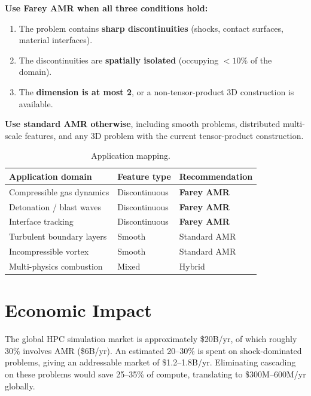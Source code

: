 \documentclass[11pt]{article}
\theoremstyle{definition}
\begin{document}
\textbf{Use Farey AMR when all three conditions hold:}
\begin{enumerate}
\item The problem contains \textbf{sharp discontinuities} (shocks,
  contact surfaces, material interfaces).
\item The discontinuities are \textbf{spatially isolated} (occupying
  $<10\%$ of the domain).
\item The \textbf{dimension is at most 2}, or a non-tensor-product
  3D construction is available.
\end{enumerate}

\textbf{Use standard AMR otherwise}, including smooth problems,
distributed multi-scale features, and any 3D problem with the
current tensor-product construction.

\begin{table}[ht]
\centering
\caption{Application mapping.}
\label{tab:applications}
\begin{tabular}{lll}
\toprule
Application domain & Feature type & Recommendation \\
\midrule
Compressible gas dynamics & Discontinuous & \textbf{Farey AMR} \\
Detonation / blast waves  & Discontinuous & \textbf{Farey AMR} \\
Interface tracking        & Discontinuous & \textbf{Farey AMR} \\
Turbulent boundary layers & Smooth        & Standard AMR \\
Incompressible vortex     & Smooth        & Standard AMR \\
Multi-physics combustion  & Mixed         & Hybrid \\
\bottomrule
\end{tabular}
\end{table}


\section{Economic Impact}\label{sec:economics}

The global HPC simulation market is approximately \$20B/yr, of
which roughly 30\% involves AMR (\$6B/yr). An estimated 20--30\%
is spent on shock-dominated problems, giving an addressable market
of \$1.2--1.8B/yr. Eliminating cascading on these problems would
save 25--35\% of compute, translating to \$300M--600M/yr globally.
\end{document}
